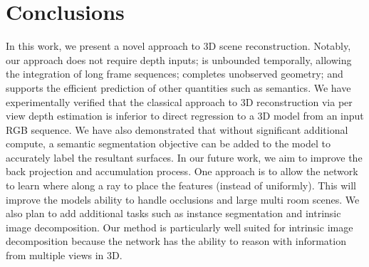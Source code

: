 \documentclass[runningheads]{llncs}
\begin{document}
\section{Conclusions}
In this work, we present a novel approach to 3D scene reconstruction. Notably, our approach does not require depth inputs; is unbounded temporally, allowing the integration of long frame sequences; completes unobserved geometry; and supports the efficient prediction of other quantities such as semantics. We have experimentally verified that the classical approach to 3D reconstruction via per view depth estimation is inferior to direct regression to a 3D model from an input RGB sequence. We have also demonstrated that without significant additional compute, a semantic segmentation objective can be added to the model to accurately label the resultant surfaces. 
In our future work, we aim to improve the back projection and accumulation process. One approach is to allow the network to learn where along a ray to place the features (instead of uniformly). This will improve the models ability to handle occlusions and large multi room scenes.
We also plan to add additional tasks such as instance segmentation and intrinsic image decomposition.
Our method is particularly well suited for intrinsic image decomposition because the network has the ability to reason with information from multiple views in 3D.







\end{document}

